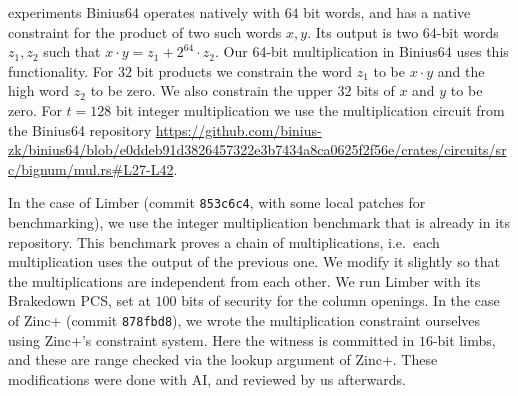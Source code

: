 \begin{lncsappendix}{experiments}
 Binius64 operates natively with $64$ bit words, and has  a native constraint for the product of two such words $x,y$. Its output is two $64$-bit words $z_1, z_2$ such that $x\cdot y = z_1 + 2^{64} \cdot z_2$. Our 64-bit multiplication in Binius64 uses this functionality.  For $32$ bit products we constrain the word $z_1$ to be $x\cdot y$ and the high word $z_2$ to be zero. We also constrain the upper $32$ bits of $x$ and $y$ to be zero. For $t=128$ bit integer multiplication we use the  multiplication circuit from the Binius64 repository \url{https://github.com/binius-zk/binius64/blob/e0ddeb91d3826457322e3b7434a8ca0625f2f56e/crates/circuits/src/bignum/mul.rs#L27-L42}. 

 In the case of Limber (commit \texttt{853c6c4}, with some local patches for benchmarking), we use the integer multiplication benchmark that is already in its repository. This benchmark proves a chain of multiplications, i.e.\ each multiplication uses the output of the previous one. We modify it slightly so that the multiplications are independent from each other. We run Limber with its Brakedown PCS, set at $100$ bits of security for the column openings. In the case of Zinc+ \cite{zincplus} (commit \texttt{878fbd8}), we wrote the multiplication constraint ourselves using Zinc+'s constraint system. Here the witness is committed in $16$-bit limbs, and these are range checked via the lookup argument of Zinc+. These modifications were done with AI, and reviewed by us afterwards.



\end{lncsappendix}
